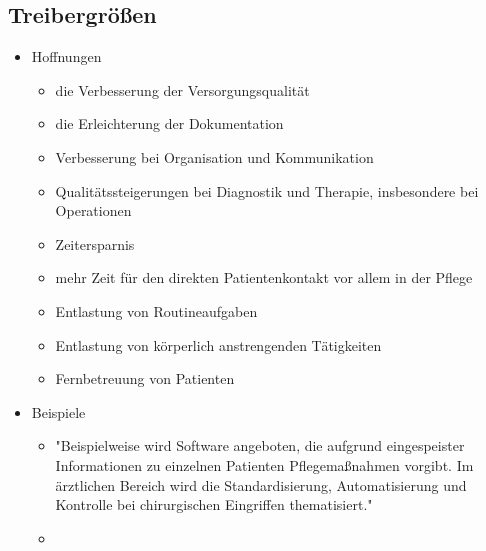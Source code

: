 	\subsection{Treibergrößen}
	\begin{itemize}
		\item Hoffnungen \parencite[15]{braeutigam2017}
		\begin{itemize}
			\item die Verbesserung der Versorgungsqualität
			\item die Erleichterung der Dokumentation
			\item Verbesserung bei Organisation und Kommunikation
			\item Qualitätssteigerungen bei Diagnostik und Therapie, insbesondere bei Operationen
			\item Zeitersparnis
			\item mehr Zeit für den direkten Patientenkontakt vor allem in der Pflege
			\item Entlastung von Routineaufgaben
			\item Entlastung von körperlich anstrengenden Tätigkeiten
			\item Fernbetreuung von Patienten
		\end{itemize}
	\end{itemize}
	\begin{itemize}
		\item Beispiele
		\begin{itemize}
			\item "Beispielweise wird Software angeboten, die aufgrund eingespeister Informationen zu einzelnen Patienten Pflegemaßnahmen vorgibt. Im ärztlichen Bereich wird die Standardisierung, Automatisierung und Kontrolle bei chirurgischen Eingriffen thematisiert." \parencite[16]{braeutigam2017}
			\item 
		\end{itemize}
	\end{itemize}
